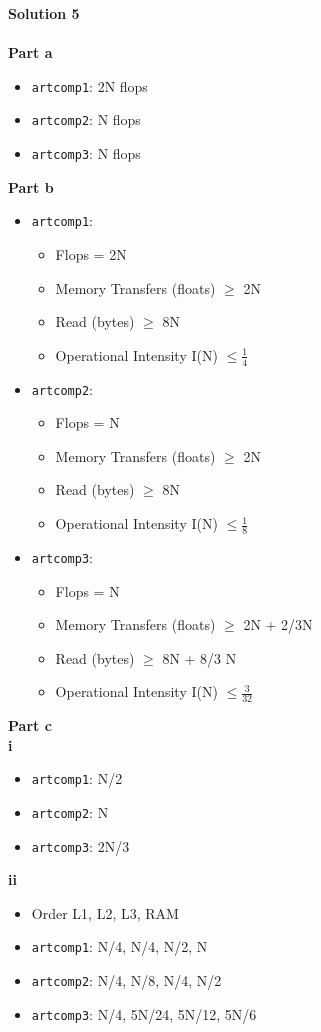 \documentclass[letterpaper, 11pt]{article}
\begin{document}
\textbf{Solution 5}\\ \\
\textbf{Part a}
\begin{itemize}
\item \texttt{artcomp1}: 2N flops
\item \texttt{artcomp2}: N flops
\item \texttt{artcomp3}: N flops
\end{itemize}
\textbf{Part b}
\begin{itemize}
\item \texttt{artcomp1}: 
\begin{itemize}
\item Flops = 2N
\item Memory Transfers (floats) $\geq$ 2N
\item Read (bytes) $\geq$ 8N
\item Operational Intensity I(N)  $\leq \frac{1}{4}$ 
\end{itemize}
\item \texttt{artcomp2}: 
\begin{itemize}
\item Flops = N
\item Memory Transfers (floats) $\geq$ 2N
\item Read (bytes) $\geq$ 8N
\item Operational Intensity I(N)  $\leq \frac{1}{8}$ 
\end{itemize}
\item \texttt{artcomp3}: 
\begin{itemize}
\item Flops = N
\item Memory Transfers (floats) $\geq$ 2N + 2/3N
\item Read (bytes) $\geq$ 8N + 8/3 N
\item Operational Intensity I(N)  $\leq \frac{3}{32}$ 
\end{itemize}
\end{itemize}
\textbf{Part c} \\
\textbf{i}
\begin{itemize}
\item \texttt{artcomp1}:  N/2
\item \texttt{artcomp2}:  N
\item \texttt{artcomp3}:  2N/3
\end{itemize}
\textbf{ii}
\begin{itemize}
\item Order L1, L2, L3, RAM
\item \texttt{artcomp1}:  N/4, N/4, N/2, N
\item \texttt{artcomp2}:  N/4, N/8, N/4, N/2 
\item \texttt{artcomp3}:  N/4, 5N/24, 5N/12, 5N/6
\end{itemize}
\bigskip

\clearpage

\end{document}
